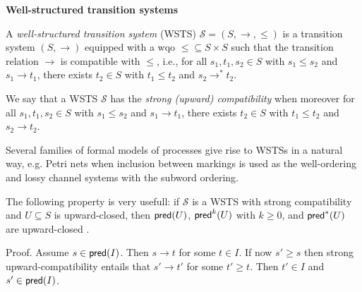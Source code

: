 \noindent
{\bf Well-structured transition systems}


\begin{definition}\cite{DBLP:journals/iandc/Finkel90,DBLP:journals/tcs/FinkelS01}
A {\em well-structured transition system} (WSTS)  $\mathscr{S}=(S, \rightarrow, \leq)$
is a transition system $(S, \rightarrow)$
equipped with a wqo ${\leq} \subseteq S \times S$ such that  
the transition relation $ \rightarrow$ is compatible with $\leq$, i.e., for all 
$s_1, t_1 , s_2 \in S$
	with $s_1 \leq s_2$  and $s_1 \rightarrow t_1$, there exists 
	$t_2 \in S$ with 
	$t_1 \leq t_2$ and $s_2 \rightarrow^{*} t_2$.
\end{definition}

We say that a WSTS $\mathscr{S}$ has the \emph{strong (upward) compatibility} when moreover for all 
$s_1, t_1 , s_2 \in S$
	with $s_1 \leq s_2$  and $s_1 \rightarrow t_1$, there exists 
	$t_2 \in S$ with 
	$t_1 \leq t_2$ and $s_2 \rightarrow t_2$.

Several families of formal models of processes give rise to WSTSs in a natural way, e.g. Petri nets when inclusion between markings is used as the well-ordering and lossy channel systems with the subword ordering.


\iffalse
\begin{proposition}\cite{DBLP:journals/tcs/FinkelS01}
If $\mathscr{S}$ is an WSTS and $U \subseteq S$ is an upward-closed set of states, then $\pred^*(U )$ is upward-
closed.
\end{proposition}
%
Proof. Assume $s \in \pred^* (U )$. Then $s \rightarrow^* t$ for some $t \in U $. If now $s' \geq s$ then upward-compatibility entails that $s' \rightarrow^* t'$ for some $t' \geq t$. Then $t' \in U$ and $s' \in \pred^*(U )$.
\fi



The following property is very usefull: if $\mathscr{S}$ is a WSTS with strong compatibility and $U \subseteq S$ is upward-closed, then $\textsf{pred}(U )$, $\textsf{pred}^k(U )$ with $k\geq0$, and $\pred^*(U )$ are upward-closed \cite{DBLP:journals/tcs/FinkelS01}.


\iffalse
Proof. Assume $s \in \textsf{pred} (I )$. Then $s \rightarrow t$ for some $t \in I $. If now $s' \geq s$ then strong upward-compatibility entails that $s' \rightarrow t'$ for some $t' \geq t$. Then $t' \in I$ and $s' \in \textsf{pred}(I )$.


